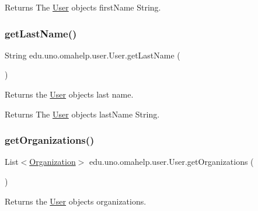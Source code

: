 \begin{DoxyReturn}{Returns}
The \mbox{\hyperlink{classedu_1_1uno_1_1omahelp_1_1user_1_1_user}{User}} object\textquotesingle{}s first\+Name String. 
\end{DoxyReturn}
\mbox{\label{classedu_1_1uno_1_1omahelp_1_1user_1_1_user_ab83571bacf7c67c22f02e744ec5e2883}} 
\subsubsection{\texorpdfstring{get\+Last\+Name()}{getLastName()}}
{\footnotesize\ttfamily String edu.\+uno.\+omahelp.\+user.\+User.\+get\+Last\+Name (\begin{DoxyParamCaption}{ }\end{DoxyParamCaption})}

Returns the \mbox{\hyperlink{classedu_1_1uno_1_1omahelp_1_1user_1_1_user}{User}} object\textquotesingle{}s last name.

\begin{DoxyReturn}{Returns}
The \mbox{\hyperlink{classedu_1_1uno_1_1omahelp_1_1user_1_1_user}{User}} object\textquotesingle{}s last\+Name String. 
\end{DoxyReturn}
\mbox{\label{classedu_1_1uno_1_1omahelp_1_1user_1_1_user_ab42cf247eaa6bf7fe736b9faf25fdec0}} 
\subsubsection{\texorpdfstring{get\+Organizations()}{getOrganizations()}}
{\footnotesize\ttfamily List$<$\mbox{\hyperlink{classedu_1_1uno_1_1omahelp_1_1organization_1_1_organization}{Organization}}$>$ edu.\+uno.\+omahelp.\+user.\+User.\+get\+Organizations (\begin{DoxyParamCaption}{ }\end{DoxyParamCaption})}

Returns the \mbox{\hyperlink{classedu_1_1uno_1_1omahelp_1_1user_1_1_user}{User}} object\textquotesingle{}s organizations.

